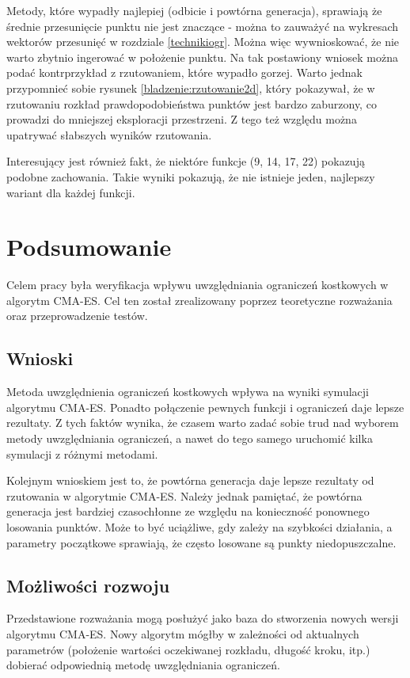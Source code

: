 \documentclass{mini}
\begin{document}
Metody, które wypadły najlepiej (odbicie i powtórna generacja), sprawiają że średnie przesunięcie punktu nie jest znaczące - można to zauważyć na wykresach wektorów przesunięć w rozdziale \ref{technikiogr}. Można więc wywnioskować, że nie warto zbytnio ingerować w położenie punktu. Na tak postawiony wniosek można podać kontrprzykład z rzutowaniem, które wypadło gorzej. Warto jednak przypomnieć sobie rysunek \ref{bladzenie:rzutowanie2d}, który pokazywał, że w rzutowaniu rozkład prawdopodobieństwa punktów jest bardzo zaburzony, co prowadzi do mniejszej eksploracji przestrzeni. Z tego też względu można upatrywać słabszych wyników rzutowania.

Interesujący jest również fakt, że niektóre funkcje (9, 14, 17, 22) pokazują podobne zachowania. Takie wyniki pokazują, że nie istnieje jeden, najlepszy wariant dla każdej funkcji.


\pagebreak

\section{Podsumowanie}
Celem pracy była weryfikacja wpływu uwzględniania ograniczeń kostkowych w algorytm CMA-ES. Cel ten został zrealizowany poprzez teoretyczne rozważania oraz przeprowadzenie testów.

\subsection{Wnioski}
Metoda uwzględnienia ograniczeń kostkowych wpływa na wyniki symulacji algorytmu CMA-ES. Ponadto połączenie pewnych funkcji i ograniczeń daje lepsze rezultaty. Z tych faktów wynika, że czasem warto zadać sobie trud nad wyborem metody uwzględniania ograniczeń, a nawet do tego samego uruchomić kilka symulacji z różnymi metodami.

Kolejnym wnioskiem jest to, że powtórna generacja daje lepsze rezultaty od rzutowania w algorytmie CMA-ES. Należy jednak pamiętać, że powtórna generacja jest bardziej czasochłonne ze względu na konieczność ponownego losowania punktów. Może to być uciążliwe, gdy zależy na szybkości działania, a parametry początkowe sprawiają, że często losowane są punkty niedopuszczalne.

\subsection{Możliwości rozwoju}
Przedstawione rozważania mogą posłużyć jako baza do stworzenia nowych wersji algorytmu CMA-ES. Nowy algorytm mógłby w zależności od aktualnych parametrów (położenie wartości oczekiwanej rozkładu, długość kroku, itp.) dobierać odpowiednią metodę uwzględniania ograniczeń.
\end{document}
